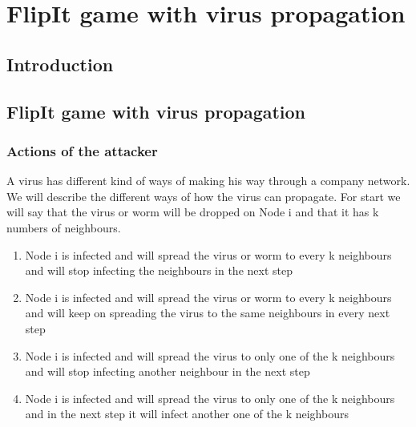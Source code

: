 \chapter{FlipIt game with virus propagation}
\label{cha:9}
%


\section{Introduction}

\section{FlipIt game with virus propagation}
\subsection{Actions of the attacker}
A virus has different kind of ways of making his way through a company network. We will describe the different ways of how the virus can propagate. For start we will say that the virus or worm will be dropped on Node i and that it has k numbers of neighbours. 
\begin{enumerate}
\item Node i is infected and will spread the virus or worm to every k neighbours and will stop infecting the neighbours in the next step
\item Node i is infected and will spread the virus or worm to every k neighbours and will keep on spreading the virus to the same neighbours in every next step
\item Node i is infected and will spread the virus to only one of the k neighbours and will stop infecting another neighbour in the next step
\item Node i is infected and will spread the virus to only one of the k neighbours and in the next step it will infect another one of the k neighbours 
\end{enumerate}

